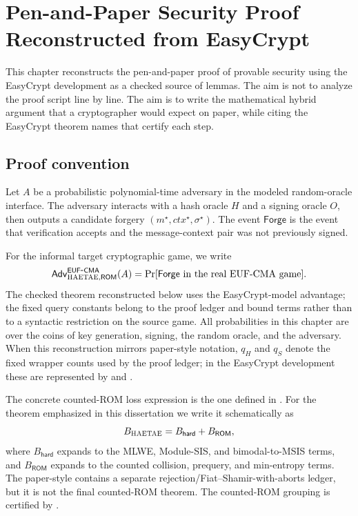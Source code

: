 \chapter{Pen-and-Paper Security Proof Reconstructed from EasyCrypt}
\label{ch:pen-paper-reconstruction}

This chapter reconstructs the pen-and-paper proof of \haetae{} provable security
using the EasyCrypt development as a checked source of lemmas.  The aim is not
to analyze the proof script line by line.  The aim is to write the mathematical
hybrid argument that a cryptographer would expect on paper, while citing the
EasyCrypt theorem names that certify each step.

\section{Proof convention}
\label{sec:paper-proof-convention}

Let \(A\) be a probabilistic polynomial-time adversary in the modeled
random-oracle interface.  The adversary interacts with a hash oracle \(H\) and a
signing oracle \(O\), then outputs a candidate forgery
\((m^\star,ctx^\star,\sigma^\star)\).  The event
\(\mathsf{Forge}\) is the event that verification accepts and the message-context
pair was not previously signed.

For the informal target cryptographic game, we write
\[
  \mathsf{Adv}_{\textsc{HAETAE},\mathsf{ROM}}^{\mathsf{EUF}\mbox{-}\mathsf{CMA}}(A)
  =
  \Pr[\mathsf{Forge}\text{ in the real EUF-CMA game}].
\]
The checked theorem reconstructed below uses the EasyCrypt-model advantage; the
fixed query constants belong to the proof ledger and bound terms rather than to a
syntactic restriction on the source \eufcma{} game.
All probabilities in this chapter are over the coins of key generation, signing,
the random oracle, and the adversary.  When this reconstruction mirrors
paper-style notation, \(q_H\) and \(q_S\) denote the fixed wrapper counts used by
the proof ledger; in the EasyCrypt development these are represented by
 and .

The concrete counted-ROM loss expression is the one defined in
.  For the theorem emphasized in this dissertation we
write it schematically as
\[
  B_{\textsc{HAETAE}}
  =
  B_{\mathsf{hard}} + B_{\mathsf{ROM}},
\]
where \(B_{\mathsf{hard}}\) expands to the MLWE, Module-SIS, and
bimodal-to-MSIS terms, and \(B_{\mathsf{ROM}}\) expands to the counted collision,
prequery, and min-entropy terms.  The paper-style
 contains a separate rejection/Fiat--Shamir-with-aborts
ledger, but it is not the final counted-ROM theorem.  The counted-ROM grouping is
certified by
.

